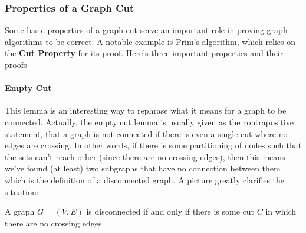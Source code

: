 \documentclass{standalone}
\begin{document}
\subsubsection{Properties of a Graph Cut}

Some basic properties of a graph cut serve an important role in proving graph
algorithms to be correct. A notable example is Prim's algorithm, which relies
on the \textbf{Cut Property} for its proof. Here's three important properties
and their proofs

\paragraph{Empty Cut}

This lemma is an interesting way to rephrase what it means for a graph to be
connected. Actually, the empty cut lemma is usually given as the contrapositive
statement, that a graph is not connected if there is even a single cut where no
edges are crossing. In other words, if there is some partitioning of nodes such
that the sets can't reach other (since there are no crossing edges), then this
means we've found (at least) two subgraphs that have no connection between them
which is the definition of a disconnected graph. A picture greatly clarifies the
situation:


\begin{lemma} \label{lem:emptycut}
  A graph $G = (V, E)$ is disconnected if and only if there is some cut $C$ in
  which there are no crossing edges.
\end{lemma}
\end{document}
